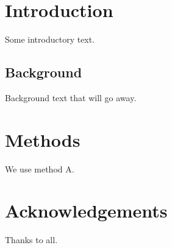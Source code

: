 \documentclass{article}
\begin{document}
\tableofcontents
\section{Introduction}
Some introductory text.
\subsection{Background}
Background text that will go away.
\section{Methods}
We use method A.
\section*{Acknowledgements}
Thanks to all.
\end{document}
